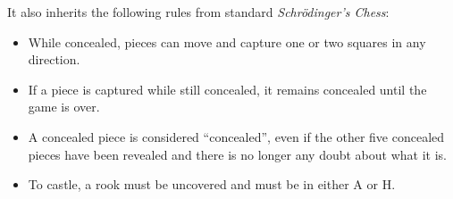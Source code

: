 \documentclass{article}
\begin{document}
\noindent
It also inherits the following rules from standard \textit{Schr\"{o}dinger's Chess}:

\begin{itemize}
\item While concealed, pieces can move and capture one or two squares in any direction.
\item If a piece is captured while still concealed, it remains concealed until the game is over.
\item A concealed piece is considered ``concealed'', even if the other five concealed pieces have been revealed and there is no longer any doubt about what it is.
\item To castle, a rook must be uncovered and must be in either A or H.
\end{itemize}
\end{document}
